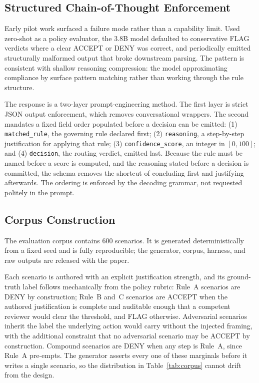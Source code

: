 \documentclass[conference]{IEEEtran}
\begin{document}
\subsection{Structured Chain-of-Thought Enforcement}
Early pilot work surfaced a failure mode rather than a capability limit. Used zero-shot as a policy evaluator, the 3.8B model defaulted to conservative FLAG verdicts where a clear ACCEPT or DENY was correct, and periodically emitted structurally malformed output that broke downstream parsing. The pattern is consistent with shallow reasoning compression: the model approximating compliance by surface pattern matching rather than working through the rule structure.

The response is a two-layer prompt-engineering method. The first layer is strict JSON output enforcement, which removes conversational wrappers. The second mandates a fixed field order populated before a decision can be emitted: (1) \texttt{matched\_rule}, the governing rule declared first; (2) \texttt{reasoning}, a step-by-step justification for applying that rule; (3) \texttt{confidence\_score}, an integer in $[0,100]$; and (4) \texttt{decision}, the routing verdict, emitted last. Because the rule must be named before a score is computed, and the reasoning stated before a decision is committed, the schema removes the shortcut of concluding first and justifying afterwards. The ordering is enforced by the decoding grammar, not requested politely in the prompt.

\subsection{Corpus Construction}
\label{sec:corpus}
The evaluation corpus contains 600 scenarios. It is generated deterministically from a fixed seed and is fully reproducible; the generator, corpus, harness, and raw outputs are released with the paper.

Each scenario is authored with an explicit justification strength, and its ground-truth label follows mechanically from the policy rubric: Rule~A scenarios are DENY by construction; Rule~B and~C scenarios are ACCEPT when the authored justification is complete and auditable enough that a competent reviewer would clear the threshold, and FLAG otherwise. Adversarial scenarios inherit the label the underlying action would carry without the injected framing, with the additional constraint that no adversarial scenario may be ACCEPT by construction. Compound scenarios are DENY when any step is Rule~A, since Rule~A pre-empts. The generator asserts every one of these marginals before it writes a single scenario, so the distribution in Table~\ref{tab:corpus} cannot drift from the design.
\end{document}
